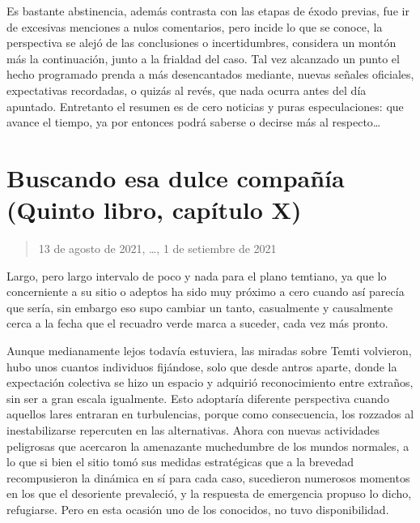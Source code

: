 \documentclass[
]{book}
\begin{document}
Es bastante abstinencia, además contrasta con las etapas de éxodo previas, fue ir de excesivas menciones a nulos comentarios, pero incide lo que se conoce, la perspectiva se alejó de las conclusiones o incertidumbres, considera un montón más la continuación, junto a la frialdad del caso. Tal vez alcanzado un punto el hecho programado prenda a más desencantados mediante, nuevas señales oficiales, expectativas recordadas, o quizás al revés, que nada ocurra antes del día apuntado. Entretanto el resumen es de cero noticias y puras especulaciones: que avance el tiempo, ya por entonces podrá saberse o decirse más al respecto\ldots{}

\hypertarget{buscando-esa-dulce-compauxf1uxeda-quinto-libro-capuxedtulo-x}{%
\section{Buscando esa dulce compañía (Quinto libro, capítulo X)}\label{buscando-esa-dulce-compauxf1uxeda-quinto-libro-capuxedtulo-x}}

\begin{quote}
13 de agosto de 2021, \ldots, 1 de setiembre de 2021
\end{quote}

Largo, pero largo intervalo de poco y nada para el plano temtiano, ya que lo concerniente a su sitio o adeptos ha sido muy próximo a cero cuando así parecía que sería, sin embargo eso supo cambiar un tanto, casualmente y causalmente cerca a la fecha que el recuadro verde marca a suceder, cada vez más pronto.

Aunque medianamente lejos todavía estuviera, las miradas sobre Temti volvieron, hubo unos cuantos individuos fijándose, solo que desde antros aparte, donde la expectación colectiva se hizo un espacio y adquirió reconocimiento entre extraños, sin ser a gran escala igualmente. Esto adoptaría diferente perspectiva cuando aquellos lares entraran en turbulencias, porque como consecuencia, los rozzados al inestabilizarse repercuten en las alternativas. Ahora con nuevas actividades peligrosas que acercaron la amenazante muchedumbre de los mundos normales, a lo que si bien el sitio tomó sus medidas estratégicas que a la brevedad recompusieron la dinámica en sí para cada caso, sucedieron numerosos momentos en los que el desoriente prevaleció, y la respuesta de emergencia propuso lo dicho, refugiarse. Pero en esta ocasión uno de los conocidos, no tuvo disponibilidad.
\end{document}
